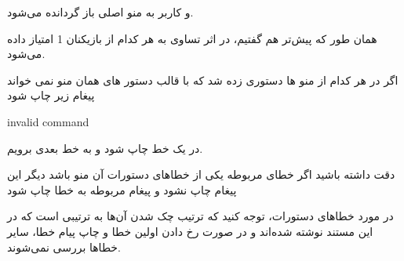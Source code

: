 \documentclass[]{article}
\begin{document}
و کاربر به منو اصلی باز گردانده می‌شود.

همان طور که پیش‌تر هم گفتیم، در اثر تساوی به هر کدام از بازیکنان 1 امتیاز داده می‌شود.

\hrulefill

اگر در هر کدام از منو ها دستوری زده شد که با قالب دستور های همان منو نمی خواند پیغام زیر چاپ شود



\begin{tcolorbox}[boxrule=0pt]
	\begin{latin}
  	  \large{
  	  	invalid command
		}
	\end{latin}
\end{tcolorbox}

در یک خط چاپ شود و به خط بعدی برویم.

دقت داشته باشید اگر خطای مربوطه یکی از خطاهای دستورات آن منو باشد دیگر این پیغام چاپ نشود و پیغام مربوطه به خطا چاپ شود

در مورد خطاهای دستورات، توجه کنید که ترتیب چک شدن آن‌ها به ترتیبی است که در این مستند نوشته شده‌اند و در صورت رخ دادن اولین خطا و چاپ پیام خطا، سایر خطاها بررسی نمی‌شوند.
\end{document}
